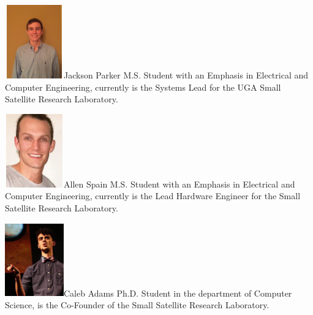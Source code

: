 \documentclass[conference]{IEEEtran}
\begin{document}


%
% 
% 



\newline
% 



\begin{IEEEbiography}{\includegraphics[width=1in,height=1.25in,clip,keepaspectratio]{jackson_parker}}{Jackson Parker}
\newline
M.S. Student with an Emphasis in Electrical and Computer Engineering, currently is the Systems Lead for the UGA Small Satellite Research Laboratory.
\end{IEEEbiography}%


\begin{IEEEbiography}{\includegraphics[width=1in,height=1.25in,clip,keepaspectratio]{allen_spain}}{Allen Spain}
\newline
\vspace{10cm}
\newline
M.S. Student with an Emphasis in Electrical and Computer Engineering, currently is the Lead Hardware Engineer for the Small Satellite Research Laboratory.
\end{IEEEbiography}


\begin{IEEEbiography}{\includegraphics[width=1in,height=1.25in,clip,keepaspectratio]{caleb_adams}}{Caleb Adams}
\newline
Ph.D. Student in the department of Computer Science, is the Co-Founder of the Small Satellite Research Laboratory.
\end{IEEEbiography}

\end{document}
